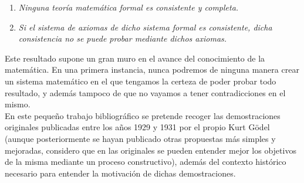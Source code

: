 \begin{center}
    \begin{enumerate}
        \item \textit{Ninguna teoría matemática formal es consistente y completa.}
        \item \textit{Si el sistema de axiomas de dicho sistema formal es consistente, dicha consistencia no se puede probar mediante dichos axiomas.}
    \end{enumerate}
\end{center}

Este resultado supone un gran muro en el avance del conocimiento de la matemática. En una primera instancia, nunca podremos de ninguna manera
crear un sistema matemático en el que tengamos la certeza de poder probar todo resultado, y además tampoco de que no vayamos a tener contradicciones en el mismo.\\

En este pequeño trabajo bibliográfico se pretende recoger las demostraciones originales publicadas entre los años 1929 y 1931 por el propio Kurt Gödel (aunque 
posteriormente se hayan publicado otras propuestas más simples y mejoradas, considero que en las originales se pueden entender mejor los objetivos de la misma mediante
un proceso constructivo), además del contexto histórico necesario para entender la motivación de dichas demostraciones.


\endinput
